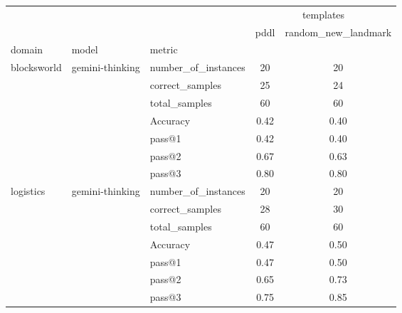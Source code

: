 \begin{tabular}{lll|cc}
\toprule
 &  &  & \multicolumn{2}{c}{templates} \\
 &  &  & pddl & random\_new\_landmark \\
domain & model & metric &  &  \\
\midrule
\multirow[t]{7}{*}{blocksworld} & \multirow[t]{7}{*}{gemini-thinking} & number\_of\_instances & 20 & 20 \\
 &  & correct\_samples & 25 & 24 \\
 &  & total\_samples & 60 & 60 \\
 &  & Accuracy & 0.42 & 0.40 \\
 &  & pass@1 & 0.42 & 0.40 \\
 &  & pass@2 & 0.67 & 0.63 \\
 &  & pass@3 & 0.80 & 0.80 \\
\cline{1-5} \cline{2-5}
\multirow[t]{7}{*}{logistics} & \multirow[t]{7}{*}{gemini-thinking} & number\_of\_instances & 20 & 20 \\
 &  & correct\_samples & 28 & 30 \\
 &  & total\_samples & 60 & 60 \\
 &  & Accuracy & 0.47 & 0.50 \\
 &  & pass@1 & 0.47 & 0.50 \\
 &  & pass@2 & 0.65 & 0.73 \\
 &  & pass@3 & 0.75 & 0.85 \\
\cline{1-5} \cline{2-5}
\bottomrule
\end{tabular}
